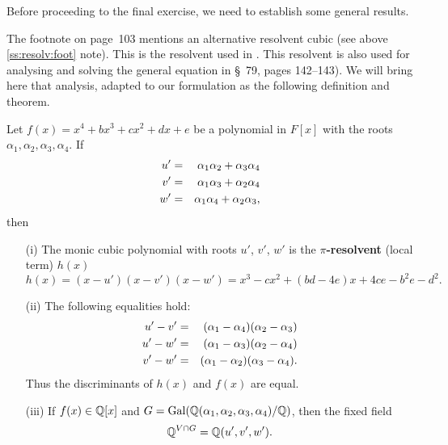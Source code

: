 Before proceeding to the final exercise, we need to 
establish some general results.


The footnote on page~103 \cite{Rotman98} mentions
an alternative resolvent cubic (see above \ref{ss:resolv:foot} note).
This is the resolvent used in \cite{Kap74}.
This resolvent is also used for analysing and solving the general
 equation in  \cite{Dickson1926} \S~79, pages 142--143).
We will bring here that analysis, adapted to our formulation
as the following definition and theorem.

\begin{lthm}
Let \label{lthm:quar:dick}
\(f(x) = x^4 + bx^3 + cx^2 + dx + e\) be a polynomial in \(F[x]\)
with the roots \(\alpha_1,\alpha_2,\alpha_3,\alpha_4\).
If
\begin{eqnarray}
u' &=& \alpha_1 \alpha_2 + \alpha_3 \alpha_4 \notag \\
v' &=& \alpha_1 \alpha_3 + \alpha_2 \alpha_4  \label{eq:resolv:uvw:tags} \\
w' &=& \alpha_1 \alpha_4 + \alpha_2 \alpha_3, \notag 
\end{eqnarray}
then
\begin{itemize}
 \item[\textnormal{(i)}]
  The monic cubic polynomial with roots $u'$, $v'$, $w'$
  is the
  \textbf{\(\pi\)-resolvent} \textnormal{(local term)} \(h(x)\)
  \begin{equation} \label{eq:prod:resolvent}
   h(x) = (x-u')(x-v')(x-w') =
     x^3 - cx^2 + (bd - 4e)x + 4ce - b^2e - d^2.
  \end{equation}

 \item[\textnormal{(ii)}]
     The following equalities hold:
     \begin{eqnarray}
      u' - v' & = & (\alpha_1 - \alpha_4)(\alpha_2 - \alpha_3) \notag \\
      u' - w' & = & (\alpha_1 - \alpha_3)(\alpha_2 - \alpha_4) 
                                         \label{eq:diff:uvw:tag} \\
      v' - w' & = & (\alpha_1 - \alpha_2)(\alpha_3 - \alpha_4). \notag
     \end{eqnarray}
     Thus the discriminants of \(h(x)\) and \(f(x)\) are equal.

 \item[\textnormal{(iii)}]
   If \(f(x)\in \mathbb{Q}[x]\) and
   \(G = \mathop{\rm Gal}\nolimits(\mathbb{Q}(\alpha_1,\alpha_2,\alpha_3,\alpha_4)/\mathbb{Q})\),
   then the fixed field 
   \begin{equation*}
   \mathbb{Q}^{V\cap G} = \mathbb{Q}(u',v',w').
   \end{equation*}

  \iffalse %
  \fi

\end{itemize}
\end{lthm}
